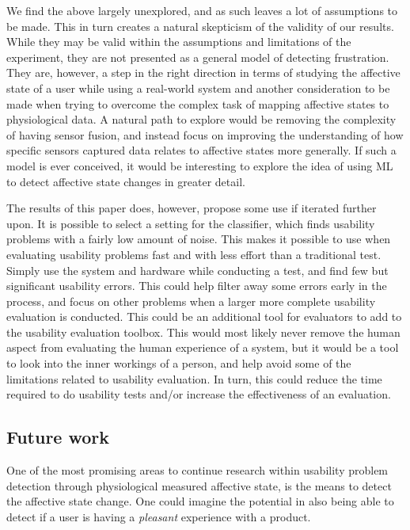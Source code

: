 We find the above largely unexplored, and as such leaves a lot of assumptions to be made.
This in turn creates a natural skepticism of the validity of our results.
While they may be valid within the assumptions and limitations of the experiment, they are not presented as a general model of detecting frustration. 
They are, however, a step in the right direction in terms of studying the affective state of a user while using a real-world system and another consideration to be made when trying to overcome the complex task of mapping affective states to physiological data. 
A natural path to explore would be removing the complexity of having sensor fusion, and instead focus on improving the understanding of how specific sensors captured data relates to affective states more generally. 
If such a model is ever conceived, it would be interesting to explore the idea of using ML to detect affective state
changes in greater detail.

The results of this paper does, however, propose some use if iterated further upon. 
It is possible to select a setting for the classifier, which finds usability problems with a fairly low amount of noise. 
This makes it possible to use when evaluating usability problems fast and with less effort than a traditional test. 
Simply use the system and hardware while conducting a test, and find few but significant usability errors. 
This could help filter away some errors early in the process, and focus on other problems when a larger more complete usability evaluation is conducted. 
This could be an additional tool for evaluators to add to the usability evaluation toolbox. 
This would most likely never remove the human aspect from evaluating the human experience of a system, but it would be a tool to look into the inner workings of a person, and help avoid some of the limitations related to usability evaluation.
In turn, this could reduce the time required to do usability tests and/or increase the effectiveness of an evaluation. 

\subsection{Future work}
One of the most promising areas to continue research within usability problem detection through physiological measured
affective state, is the means to detect the affective state change. One could imagine the potential in also being able
to detect if a user is having a \textit{pleasant} experience with a product.

